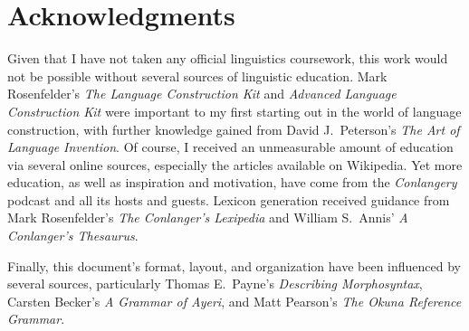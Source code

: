 \chapter{Acknowledgments}
\label{cha:acknowledgments}

Given that I have not taken any official linguistics coursework, this work would not be possible without several sources of linguistic education. Mark Rosenfelder's \textit{The Language Construction Kit}\nocite{mrlck} and \textit{Advanced Language Construction Kit}\nocite{mralck} were important to my first starting out in the world of language construction, with further knowledge gained from David J.~Peterson's \textit{The Art of Language Invention}\nocite{djpali}. Of course, I received an unmeasurable amount of education via several online sources, especially the articles available on Wikipedia. Yet more education, as well as inspiration and motivation, have come from the \textit{Conlangery} podcast and all its hosts and guests. Lexicon generation received guidance from Mark Rosenfelder's \textit{The Conlanger's Lexipedia}\nocite{mrcl} and William S.~Annis' \textit{A Conlanger's Thesaurus}\nocite{wsact}.

Finally, this document's format, layout, and organization have been influenced by several sources, particularly Thomas E.~Payne's \textit{Describing Morphosyntax}\nocite{descms}, Carsten Becker's \textit{A Grammar of Ayeri}\nocite{ayeri}, and Matt Pearson's \textit{The Okuna Reference Grammar}\nocite{okuna}.